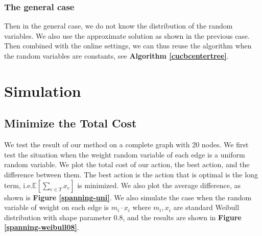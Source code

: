 \documentclass{article}
\theoremstyle{plain}
\theoremstyle{definition}
\theoremstyle{remark}
\begin{document}
    \subsubsection{The general case}
    Then in the general case, we do not know the distribution of the random variables. We also use the approximate solution as shown in the previous case. Then combined with the online settings, we can thus reuse the algorithm when the random variables are constants, see \textbf{Algorithm \ref{cucbcentertree}}.

    \section{Simulation}
    \subsection{Minimize the Total Cost}

    We test the result of our method on a complete graph with 20 nodes. We first test the situation when the weight random variable of each edge is a uniform random variable. We plot the total cost of our action, the best action, and the difference between them. The best action is the action that is optimal is the long term, i.e.$\mathbb E[\sum_{e\in T}x_e]$ is minimized. We also plot the average difference, as shown is \textbf{Figure \ref{spanning-uni}}. We also simulate the case when the random variable of weight on each edge is $m_i\cdot x_i$ where $m_i,x_i$ are standard Weibull distribution with shape parameter $0.8$, and the results are shown in \textbf{Figure \ref{spanning-weibull08}}.
\end{document}
